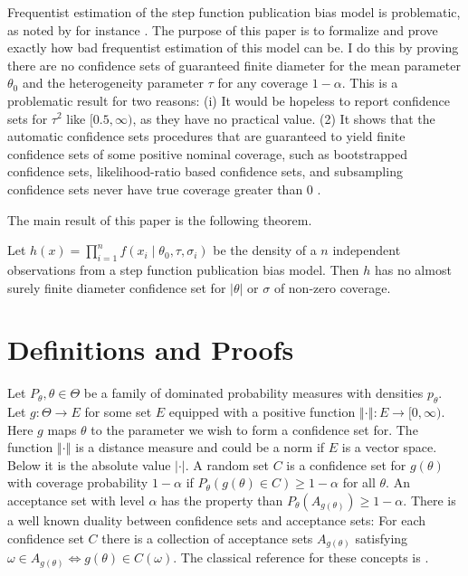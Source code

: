 \documentclass[twoside]{article}
\begin{document}
Frequentist estimation of the step function publication bias model
is problematic, as noted by for instance \citet[appendix, 1]{mcshane2016adjusting}.
The purpose of this paper is to formalize and prove exactly how bad frequentist estimation of this model can be. I do this by proving there are no confidence sets of guaranteed finite diameter for the mean parameter $\theta_{0}$
and the heterogeneity parameter $\tau$ for any coverage $1-\alpha$.
This is a problematic result for two reasons: (i) It would be hopeless
to report confidence sets for $\tau^{2}$ like $[0.5,\infty)$,
as they have no practical value. (2) It shows that the automatic confidence
sets procedures that are guaranteed to yield finite confidence sets
of some positive nominal coverage, such as bootstrapped confidence
sets, likelihood-ratio based confidence sets, and subsampling confidence
sets never have true coverage greater than $0$ \citep[see][]{gleser996bootstrap}.

The main result of this paper is the following theorem.
\begin{thm}
\label{prop:p-hacking infinite confidence interval}Let $h(x)=\prod_{i=1}^{n}f(x_{i}\mid\theta_{0},\tau,\sigma_{i})$
be the density of a $n$ independent observations from a step function
publication bias model. Then $h$ has no almost surely finite diameter
confidence set for $\left|\theta\right|$ or $\sigma$ of non-zero
coverage.
\end{thm}

\section{Definitions and Proofs}

Let $P_{\theta},\theta\in\Theta$ be a family of dominated probability
measures with densities $p_{\theta}$. Let $g:\Theta\to E$ for some
set $E$ equipped with a positive function $\left\Vert \cdot\right\Vert :E\to[0,\infty)$.
Here $g$ maps $\theta$ to the parameter we wish to form a confidence
set for. The function $\left\Vert \cdot\right\Vert $ is a distance
measure and could be a norm if $E$ is a vector space. Below it is the
absolute value $\left|\cdot\right|$. A random set $C$ is a confidence
set for $g(\theta)$ with coverage probability $1-\alpha$
if $P_{\theta}(g(\theta)\in C)\geq1-\alpha$
for all $\theta$. An\emph{ }acceptance set with level $\alpha$ has
the property than $P_{\theta}(A_{g(\theta)})\geq1-\alpha$.
There is a well known duality between confidence sets and acceptance
sets: For each confidence set $C$ there is a collection of acceptance
sets $A_{g(\theta)}$ satisfying $\omega\in A_{g(\theta)}\iff g(\theta)\in C(\omega)$.
The classical reference for these concepts is \citep[chapter 3.5]{lehmann2006testing}.
\end{document}
